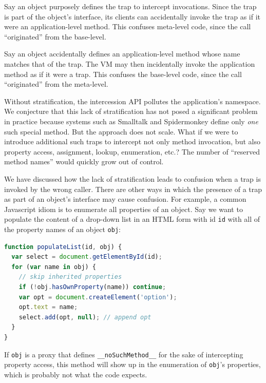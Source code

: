 \documentclass{sig-alternate}
\newcommand{\noSuchMethod}{\texttt{\_\_noSuchMethod\_\_}}
\begin{document}
\begin{itemize*}
  \item Say an object purposely defines the trap to intercept invocations. Since the trap is part of the object's interface, its clients can accidentally invoke the trap as if it were an application-level method. This confuses meta-level code, since the call ``originated'' from the base-level.
  \item Say an object accidentally defines an application-level method whose name matches that of the trap. The VM may then incidentally invoke the application method as if it were a trap. This confuses the base-level code, since the call ``originated'' from the meta-level.
\end{itemize*}

Without stratification, the intercession API pollutes the application's namespace.
We conjecture that this lack of stratification has not posed a significant problem in practice because systems such as Smalltalk and Spidermonkey define only \emph{one} such special method. But the approach does not scale. What if we were to introduce additional such traps to intercept not only method invocation, but also property access, assignment, lookup, enumeration, etc.? The number of ``reserved method names'' would quickly grow out of control.

We have discussed how the lack of stratification leads to confusion when a trap is invoked by the wrong caller. There are other ways in which the presence of a trap as part of an object's interface may cause confusion. For example, a common Javascript idiom is to enumerate all properties of an object. Say we want to populate the content of a drop-down list in an HTML form with id \texttt{id} with all of the property names of an object \texttt{obj}:

\begin{lstlisting}[language=javascript]
function populateList(id, obj) {
  var select = document.getElementById(id);
  for (var name in obj) {
    // skip inherited properties
    if (!obj.hasOwnProperty(name)) continue;
    var opt = document.createElement('option');
    opt.text = name;
    select.add(opt, null); // append opt
  }
}
\end{lstlisting}

If \texttt{obj} is a proxy that defines \noSuchMethod{} for the sake of intercepting property access, this method will show up in the enumeration of \texttt{obj}'s properties, which is probably not what the code expects.
\end{document}

